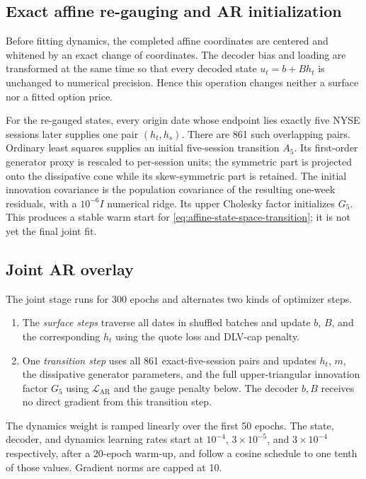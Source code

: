 \documentclass[11pt,a4paper]{article}
\begin{document}
\subsection{Exact affine re-gauging and AR initialization}

Before fitting dynamics, the completed affine coordinates are centered and
whitened by an exact change of coordinates.  The decoder bias and loading are
transformed at the same time so that every decoded state $u_t=b+B h_t$ is
unchanged to numerical precision.  Hence this operation changes neither a
surface nor a fitted option price.

For the re-gauged states, every origin date whose endpoint lies exactly five
NYSE sessions later supplies one pair $(h_t,h_s)$.  There are 861 such
overlapping pairs.  Ordinary least squares supplies an initial five-session
transition $A_5$.  Its first-order generator proxy is rescaled to per-session
units; the symmetric part is projected onto the dissipative cone while its
skew-symmetric part is retained.  The initial innovation covariance is the
population covariance of the resulting one-week residuals, with a
$10^{-6}I$ numerical ridge.  Its upper Cholesky factor initializes $G_5$.
This produces a stable warm start for
\eqref{eq:affine-state-space-transition}; it is not yet the final joint fit.

\subsection{Joint AR overlay}

The joint stage runs for 300 epochs and alternates two kinds of optimizer
steps.
\begin{enumerate}
  \item The \emph{surface steps} traverse all dates in shuffled batches and
        update $b$, $B$, and the corresponding $h_t$ using the quote loss and
        DLV-cap penalty.
  \item One \emph{transition step} uses all 861 exact-five-session pairs and updates
        $h_t$, $m$, the dissipative generator parameters, and the full
        upper-triangular innovation factor $G_5$ using
        $\mathcal L_{\mathrm{AR}}$ and the gauge penalty below.  The decoder
        $b,B$ receives no direct gradient from this transition step.
\end{enumerate}
The dynamics weight is ramped linearly over the first 50 epochs.  The state,
decoder, and dynamics learning rates start at $10^{-4}$, $3\times10^{-5}$,
and $3\times10^{-4}$ respectively, after a 20-epoch warm-up, and follow a
cosine schedule to one tenth of those values.  Gradient norms are capped at
10.
\end{document}
